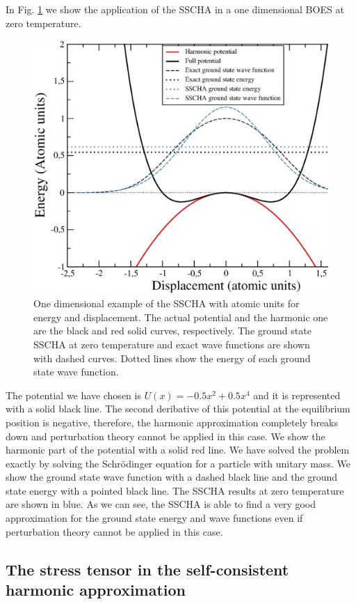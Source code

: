In Fig. \ref{1dimsscha} we show the application of the SSCHA in a one dimensional BOES at zero temperature.
\begin{figure}[h]
\begin{center}
\includegraphics[width=0.8\linewidth]{Figures/result.eps}
\caption[One dimensional example of the SSCHA]{One dimensional example of the SSCHA with atomic units for energy and displacement. The actual potential and the harmonic one are the black and red solid curves, respectively. The ground 
state SSCHA at zero temperature and exact wave functions are shown with dashed curves. Dotted lines show the energy of each ground state wave function.}
\label{1dimsscha}
\end{center}
\end{figure}
The potential we have chosen is $U(x)=-0.5x^{2}+0.5x^{4}$ and it is represented with a solid black line. The second deribative of this potential at the equilibrium position is negative, therefore, the harmonic approximation 
completely breaks down and perturbation theory cannot be applied in this case. We show the harmonic part of the potential with a solid red line. We have solved the problem exactly by solving the Schr\"odinger equation for 
a particle with unitary mass. We show the ground state wave function with a dashed black line and the ground state energy with a pointed black line. The SSCHA results at zero temperature are shown in blue. As we can 
see, the SSCHA is able to find a very good approximation for the ground state energy and wave functions even if perturbation theory cannot be applied in this case.  

\subsection{The stress tensor in the self-consistent harmonic approximation}
\label{scha-stress-section}

